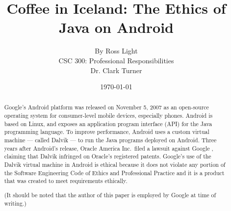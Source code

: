 \documentclass[11pt]{article}
\begin{document}
\title{\vfill Coffee in Iceland: The Ethics of Java on Android} %
\author{
By Ross Light \vspace{10pt} \\
CSC 300: Professional Responsibilities  \vspace{10pt} \\
Dr. Clark Turner \vspace{10pt} \\
}
\date{\today} %

\maketitle

\vfill  %
\begin{abstract} %
Google's Android platform was released on November 5, 2007
\cite{open-handset-alliance-ann} as an open-source operating system for
consumer-level mobile devices, especially phones.  Android is based on Linux,
and exposes an application program interface (API) for the Java programming
language.  To improve performance, Android uses a custom virtual machine ---
called Dalvik --- to run the Java programs deployed on Android.  Three years
after Android's release, Oracle America Inc.~filed a lawsuit against Google
\cite{oracle-lawsuit}, claiming that Dalvik infringed on Oracle's registered
patents.  Google's use of the Dalvik virtual machine in Android is ethical
because it does not violate any portion of the Software Engineering Code of
Ethics and Professional Practice \cite{secode} and it is a product that was
created to meet requirements ethically.

(It should be noted that the author of this paper is employed by Google at
time of writing.)
\end{abstract} %

\thispagestyle{empty} %
\newpage

\thispagestyle{empty}  %
\tableofcontents

\newpage
\end{document}
